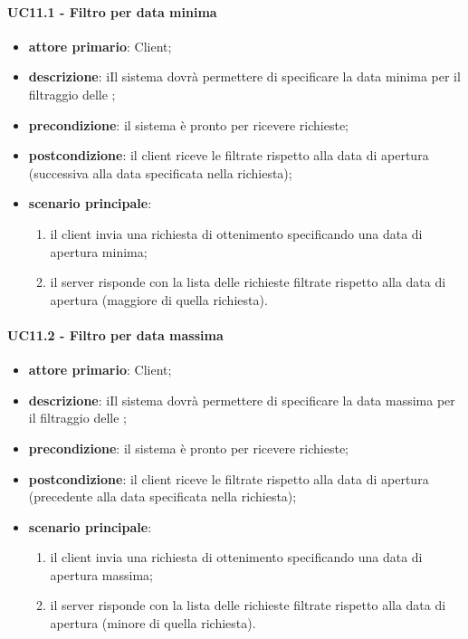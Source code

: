 \paragraph{UC11.1 - Filtro per data minima}
\begin{itemize}
	\item \textbf{attore primario}: Client;
	\item \textbf{descrizione}: iIl sistema dovrà permettere di specificare la data minima per il filtraggio delle ;
	\item \textbf{precondizione}:  il sistema è pronto per ricevere richieste;
	\item \textbf{postcondizione}: il client riceve le  filtrate rispetto alla data di apertura (successiva alla data specificata nella richiesta);
	\item \textbf{scenario principale}: 
	\begin{enumerate}
		\item  il client invia una richiesta di ottenimento  specificando una data di apertura minima;
		\item  il server risponde con la lista delle  richieste filtrate rispetto alla data di apertura (maggiore di quella richiesta).
	\end{enumerate}
\end{itemize}
\paragraph{UC11.2 - Filtro per data massima}
\begin{itemize}
	\item \textbf{attore primario}: Client;
	\item \textbf{descrizione}: iIl sistema dovrà permettere di specificare la data massima per il filtraggio delle ;
	\item \textbf{precondizione}:  il sistema è pronto per ricevere richieste;
	\item \textbf{postcondizione}: il client riceve le  filtrate rispetto alla data di apertura (precedente alla data specificata nella richiesta);
	\item \textbf{scenario principale}: 
	\begin{enumerate}
		\item  il client invia una richiesta di ottenimento  specificando una data di apertura massima;
		\item  il server risponde con la lista delle  richieste filtrate rispetto alla data di apertura (minore di quella richiesta).
	\end{enumerate}
\end{itemize}
